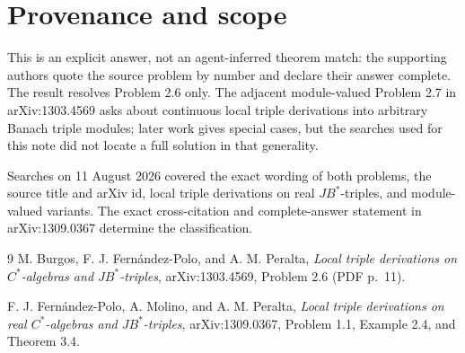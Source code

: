 \documentclass[11pt]{article}
\begin{document}
\section*{Provenance and scope}

This is an explicit answer, not an agent-inferred theorem match: the supporting
authors quote the source problem by number and declare their answer complete.
The result resolves Problem 2.6 only.  The adjacent module-valued Problem 2.7
in arXiv:1303.4569 asks about continuous local triple derivations into arbitrary
Banach triple modules; later work gives special cases, but the searches used
for this note did not locate a full solution in that generality.

Searches on 11 August 2026 covered the exact wording of both problems, the
source title and arXiv id, local triple derivations on real $JB^*$-triples, and
module-valued variants.  The exact cross-citation and complete-answer statement
in arXiv:1309.0367 determine the classification.

\begin{thebibliography}{9}
M. Burgos, F. J. Fern\'andez-Polo, and A. M. Peralta,
\emph{Local triple derivations on $C^*$-algebras and $JB^*$-triples},
arXiv:1303.4569, Problem 2.6 (PDF p.~11).

F. J. Fern\'andez-Polo, A. Molino, and A. M. Peralta,
\emph{Local triple derivations on real $C^*$-algebras and $JB^*$-triples},
arXiv:1309.0367, Problem 1.1, Example 2.4, and Theorem 3.4.
\end{thebibliography}
\end{document}
